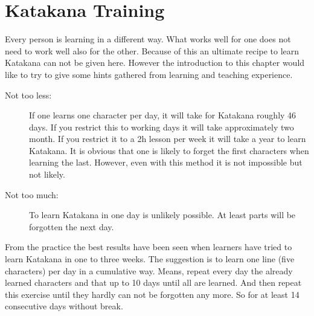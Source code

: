 \chapter{Katakana Training}\label{chap:KatakanaTraining}

\normalsize

Every person is learning in a different way. What works well for one does not
need to work well also for the other. Because of this an ultimate recipe to
learn Katakana can not be given here. However the introduction to this chapter
would like to try to give some  hints gathered from learning and teaching
experience.

\begin{description}

\item[Not too less:] If one learns one character per day, it will take for
Katakana roughly 46 days.  If you restrict this to working days it will take
approximately two month. If you restrict it to a 2h lesson per week it will
take a year to learn Katakana. It is obvious that one is likely to forget the
first characters when learning the last. However, even with this method it is
not impossible but not likely.

\item[Not too much:]  To learn Katakana in one day is unlikely possible. At
least parts will be forgotten the next day.

\end{description}

From the practice the best results have been seen when learners have tried to
learn Katakana in one to three weeks. The suggestion is to learn one line (five
characters) per day in a cumulative way. Means, repeat every day the already
learned characters and that up to 10 days until all are learned. And then
repeat this exercise until they hardly can not be forgotten any more. So for
at least 14 consecutive days without break.

